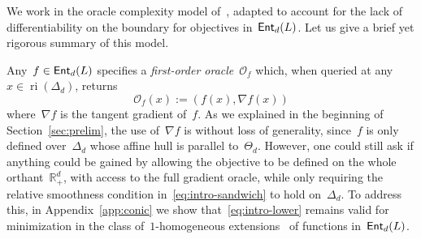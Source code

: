 \documentclass[11pt]{article}
\numberwithin{equation}{section}
\theoremstyle{remark}
\newtheorem{remark}[theorem]{Remark}
\newcommand{\R}{\mathbb{R}}
\newcommand{\ri}{\operatorname{ri}}
\newcommand{\Ent}{\textup{\textsf{Ent}}}
\newcommand{\Orc}{\mathscr{O}}
\newcommand{\Fh}{\Ent_d}
\newcommand{\Simp}{\Delta_d}
\newcommand{\Tan}{\Theta_d}
\newcommand{\1}{\mathbf{1}}
\newcommand{\bnabla}{\nabla}
\begin{document}
We work in the oracle complexity model of~\cite{nemirovski1983problem}, adapted to account for the lack of differentiability on the boundary for objectives in~$\Fh(L)$. 
Let us give a brief yet rigorous summary of this model.

Any~$f \in \Fh(L)$ specifies a {\em first-order oracle}~$\Orc_f$ which, when queried at any~$x \in \ri(\Simp)$, returns 
\begin{equation}\label{eq:oracle}
\Orc_f(x) := (f(x), \bnabla f(x))
\end{equation}
where~$\bnabla f$ is the tangent gradient of~$f$. 
As we explained in the beginning of Section~\ref{sec:prelim}, the use of~$\bnabla f$ is without loss of generality, since~$f$ is only defined over~$\Simp$ whose affine hull is parallel to~$\Tan$. 
However, one could still ask if anything could be gained by allowing the objective to be defined on the whole orthant~$\R^d_{+}$, with access to the full gradient oracle, while only requiring the relative smoothness condition in~\eqref{eq:intro-sandwich} to hold on~$\Simp$.
To address this, in Appendix~\ref{app:conic} we show that~\eqref{eq:intro-lower} remains valid for minimization in the class of~$1$-homogeneous extensions~\cite{ovcharov2018proper} of functions in~$ \Fh(L)$.



\end{document}
